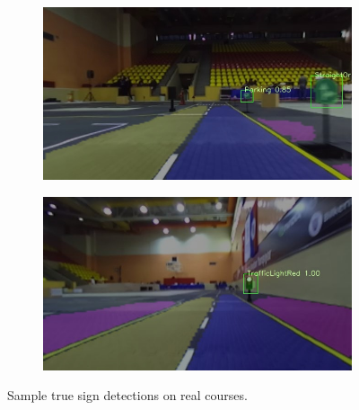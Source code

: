 \begin{figure}[h]
\begin{subfigure}[b]{0.45\linewidth}
  \end{subfigure}
  \begin{subfigure}[b]{0.45\linewidth}
    \includegraphics[width=\linewidth]{figures/experiments/real/straightorright.jpg}
  \end{subfigure}
  \begin{subfigure}[b]{0.45\linewidth}
    \includegraphics[width=\linewidth]{figures/experiments/real/trafficlightred.jpg}
  \end{subfigure}
  \caption[True sign detections on real courses]{Sample true sign
    detections on real courses.}
  \label{figure:real-course-detection-good}
\end{figure}



